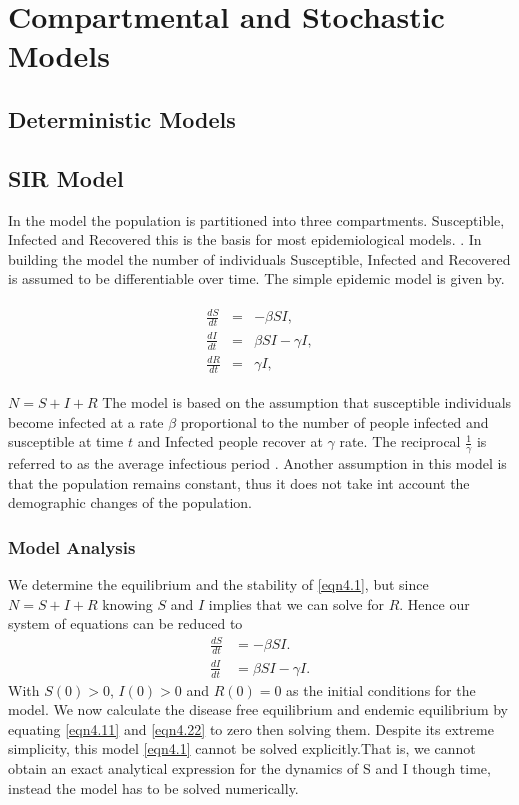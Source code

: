 \chapter{Compartmental and Stochastic Models}
\section{Deterministic Models}

\section{SIR Model}

In the model the population is partitioned into three compartments. Susceptible, Infected and Recovered this is the basis for most epidemiological models. \citep{m1925applications}. In building the model the number of individuals Susceptible, Infected and Recovered is assumed to be differentiable over time.
The simple epidemic model is given by.
\begin{center}
\begin{align} \label{eqn4.1}
\left.\begin{array}{ccl}
\frac{dS}{dt} &= &-\beta SI,\\
 \frac{dI}{dt} &=& \beta S I - \gamma  I, \\
 \frac{dR}{dt} &= &\gamma  I,
\end{array} \right. 
\end{align}
\end{center}
$N = S + I + R$
The model is based on the assumption that susceptible individuals become infected at a rate $\beta$ proportional to the number of people infected and susceptible at time $t$ and Infected people recover at $\gamma$ rate. The reciprocal $\frac{1}{\gamma}$ is referred to as the average infectious period . Another assumption in this model is that the population remains constant, thus it does not take int account the demographic changes of the population.


\subsection{Model Analysis}
We determine the equilibrium and the stability of \ref{eqn4.1}, but since $N =S +I+R$ knowing $S$ and $I$ implies that we can solve for  $R$. Hence our system of equations can be reduced to 
\begin{align}
\frac{dS}{dt} &=-\beta SI. \label{eqn4.11} \\
 \frac{dI}{dt} &= \beta S I - \gamma  I \label{eqn4.22}.
\end{align}
 With $S(0) >0$, $I(0) > 0$ and $R(0) =0$ as the initial conditions for the model.
 We now calculate the disease free equilibrium and endemic equilibrium by equating \ref{eqn4.11} and \ref{eqn4.22} to zero then solving them. Despite its extreme simplicity, this model \ref{eqn4.1} cannot be solved explicitly.That is, we cannot obtain an exact analytical expression for the dynamics of S and I
though time, instead the model has to be solved numerically.

